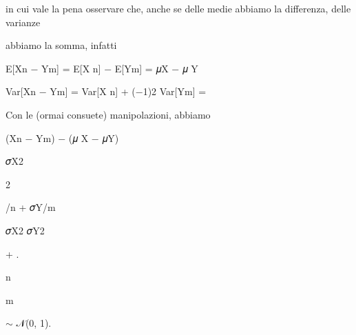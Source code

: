 \documentclass[a4paper,portrait,12pt]{article}
\begin{document}
\begin{flushleft}
in cui vale la pena osservare che, anche se delle medie abbiamo la differenza, delle varianze
\end{flushleft}


\begin{flushleft}
abbiamo la somma, infatti
\end{flushleft}


\begin{flushleft}
E[Xn $-$ Ym] = E[X n] $-$ E[Ym] = 𝜇X $-$ 𝜇 Y
\end{flushleft}


\begin{flushleft}
Var[Xn $-$ Ym] = Var[X n] + ($-$1)2 Var[Ym] =
\end{flushleft}


\begin{flushleft}
Con le (ormai consuete) manipolazioni, abbiamo
\end{flushleft}


\begin{flushleft}
(Xn $-$ Ym) $-$ (𝜇 X $-$ 𝜇Y)
\end{flushleft}


\begin{flushleft}
𝜎X2
\end{flushleft}





2





\begin{flushleft}
/n + 𝜎Y/m
\end{flushleft}





\begin{flushleft}
𝜎X2 𝜎Y2
\end{flushleft}


+ .


\begin{flushleft}
n
\end{flushleft}


\begin{flushleft}
m
\end{flushleft}





\begin{flushleft}
$\sim$ 𝒩(0, 1).
\end{flushleft}
\end{document}
